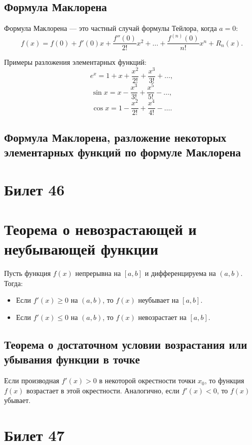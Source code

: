 \documentclass{article}
\begin{document}
\subsection*{Формула Маклорена}
Формула Маклорена — это частный случай формулы Тейлора, когда \( a = 0 \):
\[
f(x) = f(0) + f'(0)x + \frac{f''(0)}{2!}x^2 + \dots + \frac{f^{(n)}(0)}{n!}x^n + R_n(x).
\]

Примеры разложения элементарных функций:
\[
e^x = 1 + x + \frac{x^2}{2!} + \frac{x^3}{3!} + \dots,
\]
\[
\sin x = x - \frac{x^3}{3!} + \frac{x^5}{5!} - \dots,
\]
\[
\cos x = 1 - \frac{x^2}{2!} + \frac{x^4}{4!} - \dots.
\]


\subsection{ Формула Маклорена, разложение некоторых элементарных функций по формуле Маклорена}

\section{Билет 46}

\section*{Теорема о невозрастающей и неубывающей функции}
Пусть функция \( f(x) \) непрерывна на \( [a, b] \) и дифференцируема на \( (a, b) \). Тогда:
\begin{itemize}
    \item Если \( f'(x) \geq 0 \) на \( (a, b) \), то \( f(x) \) неубывает на \( [a, b] \).
    \item Если \( f'(x) \leq 0 \) на \( (a, b) \), то \( f(x) \) невозрастает на \( [a, b] \).
\end{itemize}

\subsection*{Теорема о достаточном условии возрастания или убывания функции в точке}
Если производная \( f'(x) > 0 \) в некоторой окрестности точки \( x_0 \), то функция \( f(x) \) возрастает в этой окрестности. Аналогично, если \( f'(x) < 0 \), то \( f(x) \) убывает.

\section{Билет 47}
\end{document}
